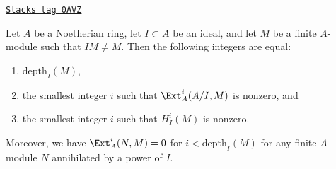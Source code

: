 \begin{lemma}[Depth]
\label{dualizing-lemma-depth}
\href{https://stacks.math.columbia.edu/tag/0AVZ}{\texttt{Stacks tag 0AVZ}}

Let $A$ be a Noetherian ring, let $I \subset A$ be an ideal, and
let $M$ be a finite $A$-module such that $IM \not = M$. Then
the following integers are equal:
\begin{enumerate}
\item $\text{depth}_I(M)$,
\item the smallest integer $i$ such that $\Ext_A^i(A/I, M)$
is nonzero, and
\item the smallest integer $i$ such that $H^i_I(M)$ is nonzero.
\end{enumerate}
Moreover, we have $\Ext^i_A(N, M) = 0$ for $i < \text{depth}_I(M)$
for any finite $A$-module $N$ annihilated by a power of $I$.
\end{lemma}


